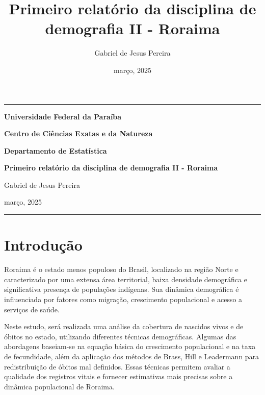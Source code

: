 \documentclass[
  12pt,
  a4paper,
]{scrreprt}
\title{Primeiro relatório da disciplina de demografia II - Roraima}
\author{Gabriel de Jesus Pereira}
\date{março, 2025}
\renewcommand*\contentsname{Índice}
\newcommand\contentsname{Índice}
\begin{document}
\cleardoublepage
\thispagestyle{empty}
{\centering
\noindent\rule{\textwidth}{0.5pt}

\vspace{2ex}

{\Large\bfseries Universidade Federal da Paraíba \par}
\vspace{1ex}
{\Large\bfseries Centro de Ciências Exatas e da Natureza \par}
\vspace{1ex}
{\Large\bfseries Departamento de Estatística \par}

\vfill

{\large\bfseries Primeiro relatório da disciplina de demografia II -
Roraima \par}

\vfill

{\large Gabriel de Jesus Pereira \par}
\vfill
{\normalsize março, 2025 \par}


\noindent\rule{\textwidth}{0.5pt}

}
\renewcommand*\contentsname{\centering Sumário \thispagestyle{empty}}
{
\hypersetup{linkcolor=}
\setcounter{tocdepth}{2}
\tableofcontents
}

\pagestyle{fancy}

\fancyhf{}
\fancyhead[RO, LE]{\thepage}
\fancyhead[LO]{\leftmark}
\fancyhead[RE]{\thepage}


\chapter{Introdução}\label{introduuxe7uxe3o}

Roraima é o estado menos populoso do Brasil, localizado na região Norte
e caracterizado por uma extensa área territorial, baixa densidade
demográfica e significativa presença de populações indígenas. Sua
dinâmica demográfica é influenciada por fatores como migração,
crescimento populacional e acesso a serviços de saúde.

\vspace{12pt}

Neste estudo, será realizada uma análise da cobertura de nascidos vivos
e de óbitos no estado, utilizando diferentes técnicas demográficas.
Algumas das abordagens baseiam-se na equação básica do crescimento
populacional e na taxa de fecundidade, além da aplicação dos métodos de
Brass, Hill e Leadermann para redistribuição de óbitos mal definidos.
Essas técnicas permitem avaliar a qualidade dos registros vitais e
fornecer estimativas mais precisas sobre a dinâmica populacional de
Roraima.
\end{document}
